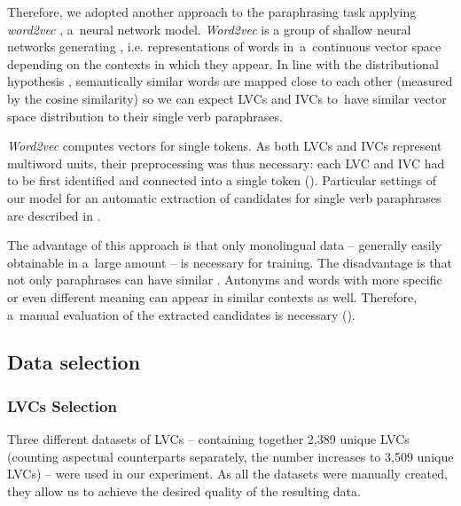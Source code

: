 \documentclass[output=paper
,modfonts
,nonflat]{langsci/langscibook}
\newcommand{\out}[1]{\textcolor[rgb]{0.8,0.8,0.8}{\textbf{#1}}}
\begin{document}

Therefore, we adopted another approach to the paraphrasing task applying 
\emph{word2vec} \citep{mikolov2013}, a~neural network model. \emph{Word2vec} 
is a group of shallow neural networks generating , i.e. 
representations  of words in~a~continuous vector space depending on the 
contexts in which they appear. In line with the distributional hypothesis 
\citep{harris54}, semantically similar words are mapped close to each other 
(measured by the  cosine similarity) so we can expect LVCs and IVCs to~have 
similar vector space distribution to their single verb paraphrases. 

\emph{Word2vec} computes vectors for single tokens. As both LVCs and IVCs 
represent multiword units, their preprocessing was thus necessary: each LVC 
and IVC had to be first identified and connected into a single token 
(). Particular settings of our model for an automatic 
extraction of candidates for single verb paraphrases are described in 
.

The advantage of this approach is that only monolingual data -- generally 
easily obtainable in a~large amount -- is necessary for  
training. The disadvantage is that not only paraphrases can have similar 
. Antonyms and words with more specific or even different meaning 
can appear in similar contexts as well. Therefore, a~manual evaluation of the 
extracted candidates is necessary ().

\subsection{Data selection}
\label{sec:datasets}

\subsubsection{LVCs Selection}
\label{sect:lvc-selection}

Three different datasets of LVCs -- containing together 2,389 unique LVCs 
(counting aspectual counterparts separately, the number increases to 3,509 
unique LVCs) -- were used in our experiment. As all the datasets were 
manually created, they allow us to achieve the desired quality of the resulting 
data. 
\end{document}
